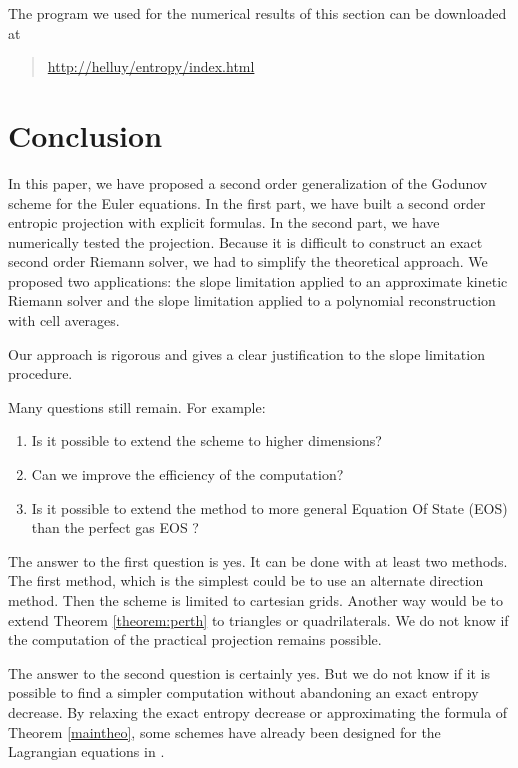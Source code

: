 \documentclass{fldauth}
\theoremstyle{plain}
\theoremstyle{plain}
\theoremstyle{plain}
\theoremstyle{plain}
\theoremstyle{plain}
\theoremstyle{plain}
\begin{document}
The program we used for the numerical results of this section can
be downloaded at
\begin{quote}
\url{http://helluy/entropy/index.html}
\end{quote}

\section{Conclusion}

In this paper, we have proposed a second order generalization of
the Godunov scheme for the Euler equations. In the first part, we
have built a second order entropic projection with explicit
formulas. In the second part, we have numerically tested the
projection. Because it is difficult to construct an exact second
order Riemann solver, we had to simplify the theoretical approach.
We proposed two applications: the slope limitation applied to an
approximate kinetic Riemann solver and the slope limitation
applied to a polynomial reconstruction with cell averages.

Our approach is rigorous and gives a clear justification to the
slope limitation procedure.

Many questions still remain. For example:
\begin{enumerate}
  \item \label{dim} Is it possible to extend the scheme to higher dimensions?
  \item \label{fast} Can we improve the efficiency of the computation?
  \item \label{neos} Is it possible to extend the method to more
  general Equation Of State (EOS) than the perfect gas EOS ?
\end{enumerate}

The answer to the first question is yes. It can be done with at
least two methods. The first method, which is the simplest could
be to use an alternate direction method. Then the scheme is
limited to cartesian grids. Another way would be to extend Theorem
\ref{theorem:perth} to triangles or quadrilaterals. We do not know
if the computation of the practical projection remains possible.

The answer to the second question is certainly yes. But we do not
know if it is possible to find a simpler computation without
abandoning an exact entropy decrease. By relaxing the exact
entropy decrease or approximating the formula of Theorem
\ref{maintheo}, some schemes have already been designed for the
Lagrangian equations in \cite{coquel_lefloch95}.
\end{document}
